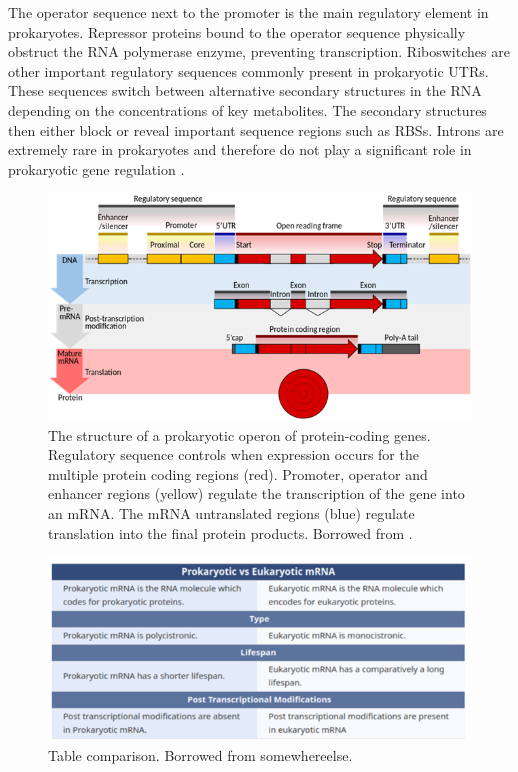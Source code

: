 The operator sequence next to the promoter is the main regulatory element in prokaryotes. Repressor proteins bound to the 
operator sequence physically obstruct the RNA polymerase enzyme, preventing transcription. Riboswitches are other important 
regulatory sequences commonly present in prokaryotic UTRs. These sequences switch between alternative secondary structures 
in the RNA depending on the concentrations of key metabolites. The secondary structures then either block or reveal important 
sequence regions such as RBSs. Introns are extremely rare in prokaryotes and therefore do not play a significant role in 
prokaryotic gene regulation \cite{Schafee2017}.

\begin{figure}[!ht]
    \centering
    \includegraphics[width=1\linewidth]{./figure/prokaryote_mrna.png}
    \caption{The structure of a prokaryotic operon of protein-coding genes. Regulatory sequence controls when expression 
    occurs for the multiple protein coding regions (red). Promoter, operator and enhancer regions (yellow) regulate the 
    transcription of the gene into an mRNA. The mRNA untranslated regions (blue) regulate translation into the final protein 
    products. Borrowed from  \cite{Schafee2017}.}
    \label{fig:prokaryote_mrna}
\end{figure}

\begin{figure}[!ht]
    \centering
    \includegraphics[width=1\linewidth]{./figure/mrna_comparison_table.png}
    \caption{Table comparison. Borrowed from somewhereelse.}
    \label{fig:mrna_comparison_table}
\end{figure}

